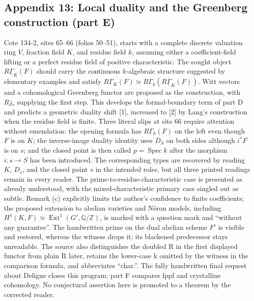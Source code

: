 \subsection*{Appendix 13: Local duality and the Greenberg construction (part E)}
Cote 134-2, sites 65--66 (folios 50--51), starts with a complete discrete valuation ring $V$, fraction field $K$, and residue field $k$, assuming either a coefficient-field lifting or a perfect residue field of positive characteristic. The sought object $R\underline\Gamma_K(F)$ should carry the continuous $k$-algebraic structure suggested by elementary examples and satisfy $R\Gamma_K(F)\simeq R\Gamma_k(R\underline\Gamma_K(F))$. Witt vectors and a cohomological Greenberg functor are proposed as the construction, with $Rj_*$ supplying the first step. This develops the formal-boundary term of part D and predicts a geometric duality shift [1], increased to [2] by Lang's construction when the residue field is finite. Three literal slips at site 66 require attention without emendation: the opening formula has $R\Gamma_k(F)$ on the left even though $F$ is on $K$; the inverse-image duality identity uses $D_S$ on both sides although $i^*F$ is on $s$; and the closed point is then called $p=\operatorname{Spec}k$ after the morphism $i:s\to S$ has been introduced. The corresponding types are recovered by reading $K$, $D_s$, and the closed point $s$ in the intended roles, but all three printed readings remain in every reader. The prime-to-residue-characteristic case is presented as already understood, with the mixed-characteristic primary case singled out as subtle. Remark (c) explicitly limits the author's confidence to finite coefficients; the proposed extension to abelian varieties and Néron models, including $H^1(K,F)\simeq\operatorname{Ext}^1(G',\mathbb Q/\mathbb Z)$, is marked with a question mark and ``without any guarantee''. The handwritten prime on the dual abelian scheme $F'$ is visible and restored, whereas the witness drops it; its blackened predecessor stays unreadable. The source also distinguishes the doubled R in the first displayed functor from plain R later, retains the lower-case k omitted by the witness in the comparison formula, and abbreviates ``char.''. The fully handwritten final request about Deligne closes this program; part F compares fppf and crystalline cohomology. No conjectural assertion here is promoted to a theorem by the corrected reader.

